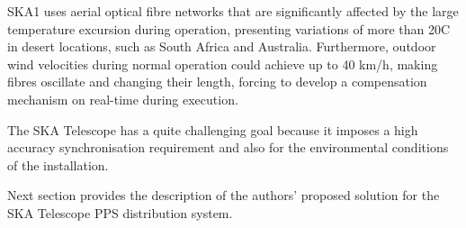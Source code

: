 SKA1 uses aerial optical fibre networks that are
significantly affected by the large temperature excursion during operation,
presenting variations of more than 20\degree C in desert locations, such as South Africa and Australia. Furthermore, outdoor wind velocities during normal operation could achieve up to 40 km/h, making fibres oscillate and changing their length, forcing to develop a compensation mechanism on real-time during execution.

The SKA Telescope has a quite challenging goal because it imposes a high accuracy synchronisation requirement and also for the environmental conditions of the installation.

Next section provides the description of the authors' proposed solution for the SKA Telescope PPS distribution system. 